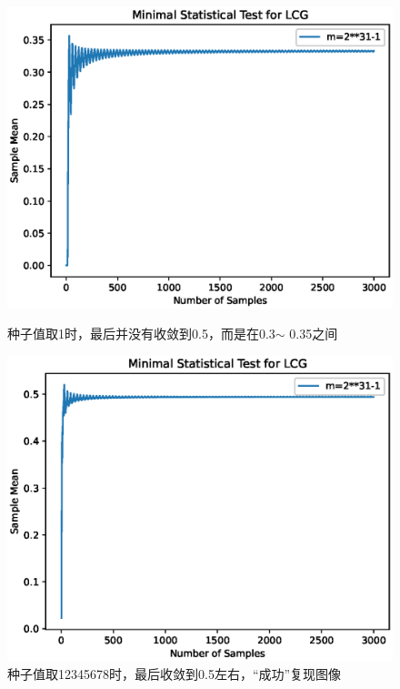 \documentclass[12pt,a4paper]{article}%
\begin{document}
    \begin{figure}[H]%
        \centering
        \begin{minipage}{0.48\textwidth}
            \centering
            \includegraphics[width=1.1\textwidth]{Problem_1}
            \caption{\fontsize{10pt}{15pt}\selectfont 种子值取1时，最后并没有收敛到0.5，而是在0.3$\sim$ 0.35之间}
        \end{minipage}
        \hspace{0cm}%
        \hfill%
        \begin{minipage}{0.48\textwidth}
            \centering
            \includegraphics[width=1.1\textwidth]{Problem_1.1}
            \caption{\fontsize{10pt}{15pt}\selectfont 种子值取12345678时，最后收敛到0.5左右，“成功”复现图像}
        \end{minipage}\label{fig:figure2}
    \end{figure}
\end{document}
